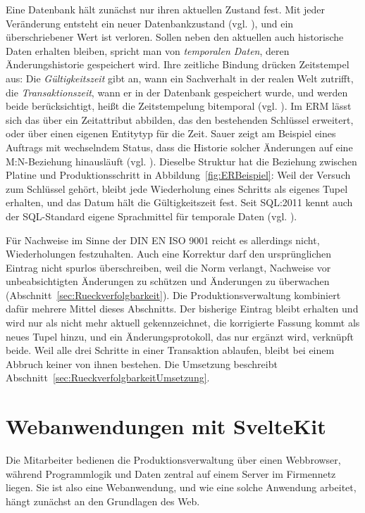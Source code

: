 Eine Datenbank hält zunächst nur ihren aktuellen Zustand fest. Mit jeder
Veränderung entsteht ein neuer Datenbankzustand (vgl.
\cite[S.~27\,f.]{kudrassDatenbankenGrundlagenUnd2015}), und ein überschriebener
Wert ist verloren. Sollen neben den aktuellen auch historische Daten erhalten
bleiben, spricht man von \emph{temporalen Daten}, deren Änderungshistorie
gespeichert wird. Ihre zeitliche Bindung drücken Zeitstempel aus: Die
\emph{Gültigkeitszeit} gibt an, wann ein Sachverhalt in der realen Welt
zutrifft, die \emph{Transaktionszeit}, wann er in der Datenbank gespeichert
wurde, und werden beide berücksichtigt, heißt die Zeitstempelung bitemporal
(vgl. \cite[S.~65]{kudrassTaschenbuchInformationsmodellierung}). Im ERM lässt
sich das über ein Zeitattribut abbilden, das den bestehenden Schlüssel
erweitert, oder über einen eigenen Entitytyp für die Zeit. Sauer zeigt am
Beispiel eines Auftrags mit wechselndem Status, dass die Historie solcher
Änderungen auf eine M:N-Beziehung hinausläuft (vgl.
\cite[S.~65\,f.]{kudrassTaschenbuchInformationsmodellierung}). Dieselbe Struktur
hat die Beziehung zwischen Platine und Produktionsschritt in
Abbildung~\ref{fig:ERBeispiel}: Weil der Versuch zum Schlüssel gehört, bleibt
jede Wiederholung eines Schritts als eigenes Tupel erhalten, und das Datum hält
die Gültigkeitszeit fest. Seit SQL:2011 kennt auch der SQL-Standard eigene
Sprachmittel für temporale Daten (vgl.
\cite[S.~102]{kudrassTaschenbuchDatenbankspracheSQL}).

Für Nachweise im Sinne der DIN EN ISO 9001 reicht es allerdings nicht,
Wiederholungen festzuhalten. Auch eine Korrektur darf den ursprünglichen
Eintrag nicht spurlos überschreiben, weil die Norm verlangt, Nachweise vor
unbeabsichtigten Änderungen zu schützen und Änderungen zu überwachen
(Abschnitt~\ref{sec:Rueckverfolgbarkeit}). Die Produktionsverwaltung kombiniert
dafür mehrere Mittel dieses Abschnitts. Der bisherige Eintrag bleibt erhalten
und wird nur als nicht mehr aktuell gekennzeichnet, die korrigierte Fassung
kommt als neues Tupel hinzu, und ein Änderungsprotokoll, das nur ergänzt wird,
verknüpft beide. Weil alle drei Schritte in einer Transaktion ablaufen, bleibt
bei einem Abbruch keiner von ihnen bestehen. Die Umsetzung beschreibt
Abschnitt~\ref{sec:RueckverfolgbarkeitUmsetzung}.

\section{Webanwendungen mit SvelteKit}
\label{sec:SvelteKit}
Die Mitarbeiter bedienen die Produktionsverwaltung über einen Webbrowser,
während Programmlogik und Daten zentral auf einem Server im Firmennetz liegen.
Sie ist also eine Webanwendung, und wie eine solche Anwendung arbeitet, hängt
zunächst an den Grundlagen des Web.

